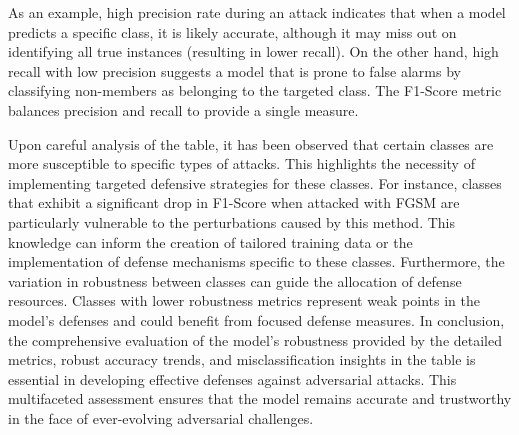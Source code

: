 \documentclass[10pt, conference, a4paper, final]{IEEEtran}
\begin{document}
As an example, high precision rate during an attack indicates that when a model predicts a specific class, it is likely accurate, although it may miss out on identifying all true instances (resulting in lower recall). On the other hand, high recall with low precision suggests a model that is prone to false alarms by classifying non-members as belonging to the targeted class. The F1-Score metric balances precision and recall to provide a single measure.

Upon careful analysis of the table, it has been observed that certain classes are more susceptible to specific types of attacks. This highlights the necessity of implementing targeted defensive strategies for these classes. For instance, classes that exhibit a significant drop in F1-Score when attacked with FGSM are particularly vulnerable to the perturbations caused by this method. This knowledge can inform the creation of tailored training data or the implementation of defense mechanisms specific to these classes.
Furthermore, the variation in robustness between classes can guide the allocation of defense resources. Classes with lower robustness metrics represent weak points in the model's defenses and could benefit from focused defense measures.
In conclusion, the comprehensive evaluation of the model's robustness provided by the detailed metrics, robust accuracy trends, and misclassification insights in the table is essential in developing effective defenses against adversarial attacks. This multifaceted assessment ensures that the model remains accurate and trustworthy in the face of ever-evolving adversarial challenges.
\end{document}
